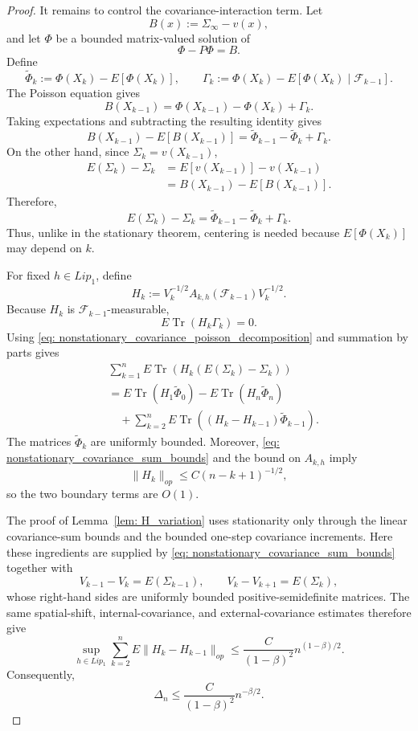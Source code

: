 \documentclass[11pt]{article}
\begin{document}
\begin{proof}
It remains to control the covariance-interaction term. Let
\[
B(x):=\Sigma_\infty-v(x),
\]
and let $\Phi$ be a bounded matrix-valued solution of
\[
\Phi-P\Phi=B.
\]
Define
\[
\widetilde\Phi_k
:=
\Phi(X_k)-E[\Phi(X_k)],
\qquad
\Gamma_k
:=
\Phi(X_k)-E[\Phi(X_k)\mid\mathcal F_{k-1}].
\]
The Poisson equation gives
\[
B(X_{k-1})
=
\Phi(X_{k-1})-\Phi(X_k)+\Gamma_k.
\]
Taking expectations and subtracting the resulting identity gives
\[
B(X_{k-1})-E[B(X_{k-1})]
=
\widetilde\Phi_{k-1}
-
\widetilde\Phi_k
+
\Gamma_k.
\]
On the other hand, since $\Sigma_k=v(X_{k-1})$,
\begin{align*}
E(\Sigma_k)-\Sigma_k
&=
E[v(X_{k-1})]-v(X_{k-1})
\\
&=
B(X_{k-1})-E[B(X_{k-1})].
\end{align*}
Therefore,
\begin{equation}
\label{eq: nonstationary_covariance_poisson_decomposition}
E(\Sigma_k)-\Sigma_k
=
\widetilde\Phi_{k-1}
-
\widetilde\Phi_k
+
\Gamma_k.
\end{equation}
Thus, unlike in the stationary theorem, centering is needed because
$E[\Phi(X_k)]$ may depend on $k$.

For fixed $h\in Lip_1$, define
\[
H_k
:=
V_k^{-1/2}
A_{k,h}(\mathcal F_{k-1})
V_k^{-1/2}.
\]
Because $H_k$ is $\mathcal F_{k-1}$-measurable,
\[
E\operatorname{Tr}(H_k\Gamma_k)=0.
\]
Using
\eqref{eq: nonstationary_covariance_poisson_decomposition}
and summation by parts gives
\begin{align*}
&\sum_{k=1}^n
E\operatorname{Tr}
\left(
H_k(E(\Sigma_k)-\Sigma_k)
\right)
\\
&=
E\operatorname{Tr}(H_1\widetilde\Phi_0)
-
E\operatorname{Tr}(H_n\widetilde\Phi_n)
\\
&\quad+
\sum_{k=2}^n
E\operatorname{Tr}
\left(
(H_k-H_{k-1})\widetilde\Phi_{k-1}
\right).
\end{align*}
The matrices $\widetilde\Phi_k$ are uniformly bounded. Moreover,
\eqref{eq: nonstationary_covariance_sum_bounds}
and the bound on $A_{k,h}$ imply
\[
\|H_k\|_{op}
\leq
C(n-k+1)^{-1/2},
\]
so the two boundary terms are $O(1)$.

The proof of Lemma~\ref{lem: H_variation} uses stationarity only
through the linear covariance-sum bounds and the bounded one-step
covariance increments. Here these ingredients are supplied by
\eqref{eq: nonstationary_covariance_sum_bounds} together with
\[
V_{k-1}-V_k=E(\Sigma_{k-1}),
\qquad
V_k-V_{k+1}=E(\Sigma_k),
\]
whose right-hand sides are uniformly bounded positive-semidefinite
matrices. The same spatial-shift, internal-covariance, and
external-covariance estimates therefore give
\[
\sup_{h\in Lip_1}
\sum_{k=2}^n
E\|H_k-H_{k-1}\|_{op}
\leq
\frac{C}{(1-\beta)^2}n^{(1-\beta)/2}.
\]
Consequently,
\[
\Delta_n
\leq
\frac{C}{(1-\beta)^2}n^{-\beta/2}.
\]


\end{proof}
\end{document}
